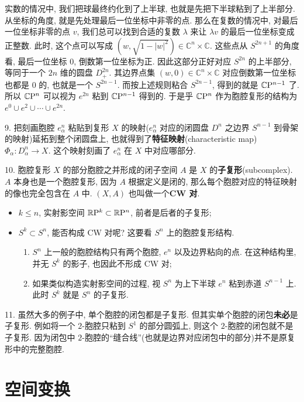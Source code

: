 实数的情况中, 我们把球最终约化到了上半球, 也就是先把下半球粘到了上半部分. 从坐标的角度, 就是先处理最后一位坐标中非零的点. 那么在复数的情况中, 对最后一位坐标非零的点 $v$, 我们总可以找到合适的复数 $\lambda$ 来让 $\lambda v$ 的最后一位坐标变成正整数. 此时, 这个点可以写成 $(w, \sqrt{1 - |w|^2}) \in \mathbb{C}^{n} \times \mathbb{C}$. 这些点从 $S^{2n + 1}$ 的角度看, 最后一位坐标 $0$, 倒数第一位坐标为正. 因此这部分正好对应 $S^{2n}$ 的上半部分, 等同于一个 $2n$ 维的圆盘 $D^{2n}_+$. 其边界点集 $(w, 0) \in \mathbb{C}^{n} \times \mathbb{C}$ 对应倒数第一位坐标也都是 $0$ 的, 也就是一个 $S^{2n - 1}$. 而按上述规则粘合 $S^{2n - 1}$, 得到的就是 $\mathbb{C}\mathrm{P}^{n - 1}$ 了. 所以 $\mathbb{C}\mathrm{P}^{n}$ 可以视为 $e^{2n}$ 粘到 $\mathbb{C}\mathrm{P}^{n - 1}$ 得到的. 于是乎 $\mathbb{C}\mathrm{P}^{n}$ 作为胞腔复形的结构为 $e^0 \cup e^2 \cup \cdots \cup e^{2n}$.

9. 把刻画胞腔 $e^n_{\alpha}$ 粘贴到复形 $X$ 的映射($e^n_{\alpha}$ 对应的闭圆盘 $D^{n}$ 之边界 $S^{n - 1}$ 到骨架的映射)延拓到整个闭圆盘上, 也就得到了{\bf 特征映射}(characteristic map) $\Phi_{\alpha}: D^{n}_{\alpha} \rightarrow X$. 这个映射刻画了 $e^n_{\alpha}$ 在 $X$ 中对应哪部分.

10. 胞腔复形 $X$ 的部分胞腔之并形成的闭子空间 $A$ 是 $X$ 的{\bf 子复形}(subcomplex). $A$ 本身也是一个胞腔复形, 因为 $A$ 根据定义是闭的, 那么每个胞腔对应的特征映射的像也完全包含在 $A$ 中. $(X, A)$ 也叫做一个{\bf CW 对}.

\begin{itemize}
	\item $k \leq n$, 实射影空间 $\mathbb{R}\mathrm{P}^{k} \subset \mathbb{R}\mathrm{P}^{n}$, 前者是后者的子复形;
	\item $S^k \subset S^n$, 能否构成 CW 对呢? 这要看 $S^n$ 上的胞腔复形结构. 
	\begin{enumerate}
		\item $S^n$ 上一般的胞腔结构只有两个胞腔, $e^n$ 以及边界粘向的点. 在这种结构里, 并无 $S^k$ 的影子, 也因此不形成 CW 对;
		\item 如果类似构造实射影空间的过程, 视 $S^n$ 为上下半球 $e^n$ 粘到赤道 $S^{n - 1}$ 上. 此时 $S^k$ 就是 $S^n$ 的子复形.
	\end{enumerate}
\end{itemize}

11. 虽然大多的例子中, 单个胞腔的闭包都是子复形. 但其实单个胞腔的闭包{\bf 未必}是子复形. 例如将一个 $2$-胞腔只粘到 $S^1$ 的部分圆弧上, 则这个 $2$-胞腔的闭包就不是子复形. 因为闭包中 $2$-胞腔的``缝合线''(也就是边界对应闭包中的部分)并不是原复形中的完整胞腔.

\section{空间变换}

